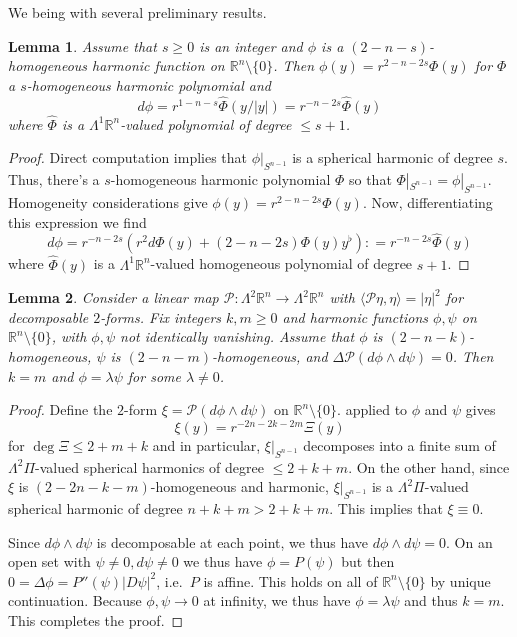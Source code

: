 \documentclass[11pt]{amsart}
\numberwithin{equation}{section}
\theoremstyle{plain}
\newtheorem{lemma}[lemma]{Lemma}
\theoremstyle{definition}
\theoremstyle{remark}
\newcommand{\R}{\mathbb{R}}
\newcommand{\Pscr}{\mathscr{P}}
\newcommand{\bangle}[1]{\langle #1 \rangle}
\begin{document}
We being with several preliminary results.  


\begin{lemma}\label{lemm:deriv-harmonic-degree-up}
Assume that $s \geq 0$ is an integer and $\phi$ is a $(2-n-s)$-homogeneous harmonic function on $\R^n\setminus\{0\}$. Then $\phi(y) = r^{2-n-2s}\Phi(y)$ for $\Phi$ a $s$-homogeneous harmonic polynomial and 
\[
d\phi = r^{1-n-s} \widehat \Phi(y/|y|) = r^{-n-2s}\widehat \Phi(y)
\]
where $\widehat \Phi$ is a $\Lambda^1\R^n$-valued polynomial of degree $\leq s+1$. 
\end{lemma}
\begin{proof}
Direct computation implies that $\phi|_{S^{n-1}}$ is a spherical harmonic of degree $s$. Thus, there's a $s$-homogeneous harmonic polynomial $\Phi$ so that $\Phi|_{S^{n-1}} = \phi|_{S^{n-1}}$. Homogeneity considerations give  $\phi(y) = r^{2-n-2s}\Phi(y)$. Now, differentiating this expression we find
\[
d\phi = r^{-n-2s}(r^2 d\Phi(y) + (2-n-2s)\Phi(y) y^\flat) : = r^{-n-2s} \widehat\Phi(y)
\]
where $\widehat \Phi(y)$ is a $\Lambda^1\R^n$-valued homogeneous polynomial of degree $s+1$.
\end{proof}
\begin{lemma}\label{lemm:model-problem-harmonic}
Consider a linear map $\Pscr : \Lambda^2 \R^n\to\Lambda^2\R^n$ with $\bangle{\Pscr\eta,\eta} = |\eta|^2$ for decomposable $2$-forms. Fix integers $k,m\geq 0$ and harmonic functions $\phi,\psi$ on $\R^n\setminus \{0\}$, with $\phi,\psi$ not identically vanishing. Assume that $\phi$ is $(2-n-k)$-homogeneous, $\psi$ is $(2-n-m)$-homogeneous, and $\Delta \Pscr(d\phi \wedge d\psi) = 0$. Then $k=m$ and $\phi=\lambda \psi$ for some $\lambda \neq 0$. 
\end{lemma}
\begin{proof}
Define the $2$-form $\xi = \Pscr(d\phi \wedge d\psi)$ on $\R^n\setminus\{0\}$.   applied to $\phi$ and $\psi$ gives
\[
\xi(y) = r^{-2n-2k-2m} \Xi(y)
\]
for $\deg \Xi \leq 2+m+k$ and in particular, $\xi|_{S^{n-1}}$ decomposes into a finite sum of $\Lambda^2\Pi$-valued spherical harmonics of degree $\leq 2+k+m$. On the other hand, since $\xi$ is $(2-2n-k-m)$-homogeneous and harmonic, $\xi|_{S^{n-1}}$ is a $\Lambda^2\Pi$-valued spherical harmonic of degree $n+k+m > 2+k+m$. This implies that $\xi\equiv 0$. 

Since $d\phi\wedge d\psi$ is decomposable at each point, we thus have $d\phi\wedge d\psi = 0$.  On an open set with $\psi\neq 0,d\psi \neq 0$ we thus have $\phi=P(\psi)$ but then $0 = \Delta \phi = P''(\psi)|D \psi|^2$, i.e.\ $P$ is affine. This holds on all of $\R^n\setminus\{0\}$ by unique continuation. Because $\phi,\psi\to0$ at infinity, we thus have $\phi=\lambda \psi$ and thus $k=m$. This completes the proof. 
\end{proof}
\end{document}
